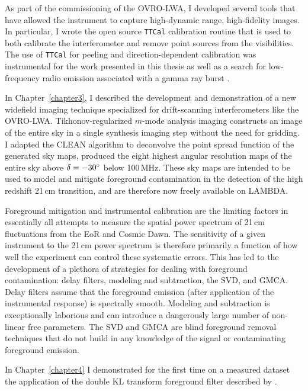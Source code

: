 \begin{bibunit}
As part of the commissioning of the OVRO-LWA, I developed several tools that have allowed the
instrument to capture high-dynamic range, high-fidelity images.  In particular, I wrote the open
source \texttt{TTCal} calibration routine that is used to both calibrate the interferometer and
remove point sources from the visibilities. The use of \texttt{TTCal} for peeling and
direction-dependent calibration was instrumental for the work presented in this thesis as well as a
search for low-frequency radio emission associated with a gamma ray burst
\citep{2017arXiv171106665A}.

In Chapter~\ref{chapter3}, I described the development and demonstration of a new widefield imaging
technique specialized for drift-scanning interferometers like the OVRO-LWA. Tikhonov-regularized
$m$-mode analysis imaging constructs an image of the entire sky in a single synthesis imaging step
without the need for gridding. I adapted the CLEAN algorithm to deconvolve the point spread function
of the generated sky maps, produced the eight highest angular resolution maps of the entire sky
above $\delta=-30\mbox{$^\circ$}$ below 100\,MHz. These sky maps are intended to be used to model and
mitigate foreground contamination in the detection of the high redshift 21\,cm transition, and are
therefore now freely available on LAMBDA.

Foreground mitigation and instrumental calibration are the limiting factors in essentially all
attempts to measure the spatial power spectrum of 21\,cm fluctuations from the EoR and Cosmic Dawn.
The sensitivity of a given instrument to the 21\,cm power spectrum is therefore primarily a function
of how well the experiment can control these systematic errors. This has led to the development of a
plethora of strategies for dealing with foreground contamination: delay filters, modeling and
subtraction, the SVD, and GMCA. Delay filters assume that the foreground emission (after application
of the instrumental response) is spectrally smooth. Modeling and subtraction is exceptionally
laborious and can introduce a dangerously large number of non-linear free parameters. The SVD and
GMCA are blind foreground removal techniques that do not build in any knowledge of the signal or
contaminating foreground emission.

In Chapter~\ref{chapter4} I demonstrated for the first time on a
measured dataset the application of the double KL transform foreground filter described by
\citep{2014ApJ...781...57S, 2015PhRvD..91h3514S}.







\end{bibunit}
